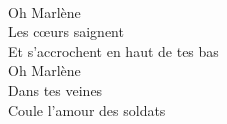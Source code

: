 \\
Oh Marlène\\
Les cœurs saignent\\
Et s'accrochent en haut de tes bas\\
Oh Marlène\\
Dans tes veines\\
Coule l'amour des soldats\\
